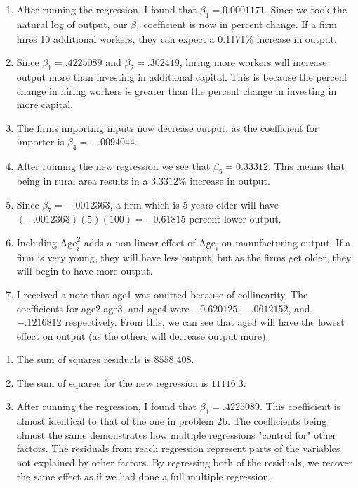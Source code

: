 \documentclass[11pt,twoside,openany]{memoir}
\begin{document}
    \begin{question}
        \phantom{a}
        \begin{enumerate}[label = (\alph*),itemsep=1pt,topsep=3pt]
            \item After running the regression, I found that $\beta_1 = 0.0001171$. Since we took the natural log of output, our $\beta_1$ coefficient is now in percent change. If a firm hires 10 additional workers, they can expect a 0.1171\% increase in output.
            \item Since $\beta_1 = .4225089$ and $\beta_2 = .302419$, hiring more workers will increase output more than investing in additional capital. This is because the percent change in hiring workers is greater than the percent change in investing in more capital.
            \item The firms importing inputs now decrease output, as the coefficient for importer is $\beta_4 = -.0094044$.
            \item After running the new regression we see that $\beta_5 = 0.33312$. This means that being in rural area results in a $3.3312\%$ increase in output.
            \item Since $\beta_7 = -.0012363$, a firm which is 5 years older will have $(-.0012363)(5)(100) = -0.61815$ percent lower output.
            \item Including $\text{Age}_i^2$ adds a non-linear effect of $\text{Age}_i$ on manufacturing output. If a firm is very young, they will have less output, but as the firms get older, they will begin to have more output.
            \item I received a note that age1 was omitted because of collinearity. The coefficients for age2,age3, and age4 were $-0.620125$, $-.0612152$, and $-.1216812$ respectively. From this, we can see that age3 will have the lowest effect on output (as the others will decrease output more).
        \end{enumerate}
    \end{question}
    \begin{question}
        \phantom{a}
        \begin{enumerate}[label = (\alph*),itemsep=1pt,topsep=3pt]
            \item The sum of squares residuals is $8558.408$.
            \item The sum of squares for the new regression is $11116.3$.
            \item After running the regression, I found that $\beta_1 = .4225089$. This coefficient is almost identical to that of the one in problem 2b. The coefficients being almost the same demonstrates how multiple regressions "control for" other factors. The residuals from reach regression represent parts of the variables not explained by other factors. By regressing both of the residuals, we recover the same effect as if we had done a full multiple regression.
        \end{enumerate}
    \end{question}
\end{document}
